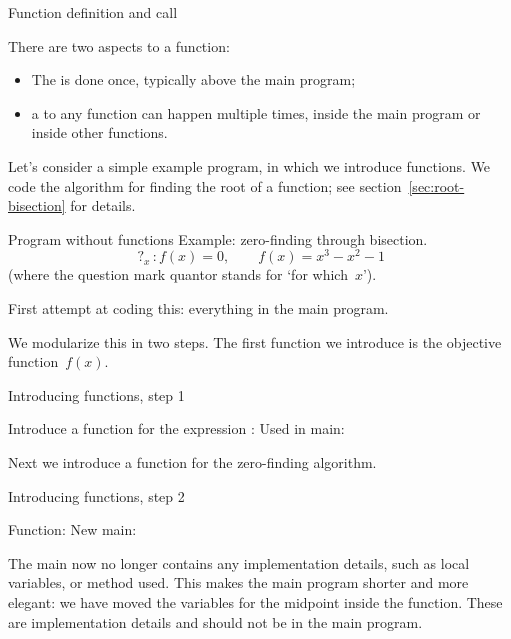  {Function definition and call}

There are two aspects to a function:
\begin{itemize}
\item
  The  is done once, typically
  above the main program;
\item a  to any function can happen
  multiple times, inside the main program or inside other functions.
\end{itemize}

Let's consider a simple example program,
in which we introduce functions.
We code the  algorithm for finding
the root of a function;
see section~\ref{sec:root-bisection} for details.

\begin{block}{Program without functions}
  \label{sl:nodef-nocall}
  Example: zero-finding through bisection.
  \[ \mathop{?}_x\colon f(x)=0,\qquad f(x)=x^3-x^2-1 \]
  (where the question mark quantor stands for `for which~$x$').

  First attempt at coding this: everything in the main program.
\end{block}

We modularize this in two steps.
The first function we introduce is the objective function~$f(x)$.

\begin{block}{Introducing functions, step 1}
  \label{sl:def-call1}
  \begin{multicols}{2}
Introduce a function for the expression :
Used in main:
\columnbreak
{}
  \end{multicols}
\end{block}

Next we introduce a function for the zero-finding algorithm.

\begin{block}{Introducing functions, step 2}
  \label{sl:def-call2}
  \begin{multicols}{2}
    Function:
    \columnbreak
    New main:
    \vfill
  \end{multicols}
\end{block}

The main now no longer contains any implementation details,
such as local variables, or method used.
This makes the main program shorter and more elegant:
we have moved the variables for the midpoint inside the function.
These are implementation details and should not be in the main program.

